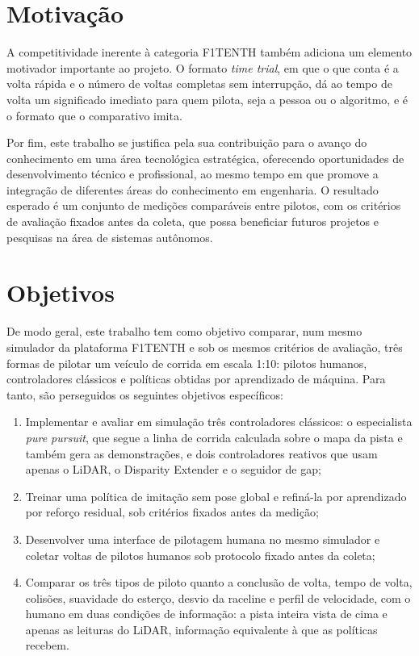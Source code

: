 \section*{Motivação}\label{sec:motivacao}

A competitividade inerente à categoria F1TENTH também adiciona um elemento
motivador importante ao projeto. O formato \textit{time trial}, em que o que
conta é a volta rápida e o número de voltas completas sem interrupção, dá ao
tempo de volta um significado imediato para quem pilota, seja a pessoa ou o
algoritmo, e é o formato que o comparativo imita.

Por fim, este trabalho se justifica pela sua contribuição para o avanço do
conhecimento em uma área tecnológica estratégica, oferecendo oportunidades de
desenvolvimento técnico e profissional, ao mesmo tempo em que promove a
integração de diferentes áreas do conhecimento em engenharia. O resultado
esperado é um conjunto de medições comparáveis entre pilotos, com os critérios de
avaliação fixados antes da coleta, que possa beneficiar futuros projetos e
pesquisas na área de sistemas autônomos.

\section*{Objetivos}\label{sec:objetivos}

De modo geral, este trabalho tem como objetivo comparar, num mesmo simulador da
plataforma F1TENTH e sob os mesmos critérios de avaliação, três formas de
pilotar um veículo de corrida em escala 1:10: pilotos humanos, controladores
clássicos e políticas obtidas por aprendizado de máquina. Para tanto, são
perseguidos os seguintes objetivos específicos:
\begin{enumerate}
    \item Implementar e avaliar em simulação três controladores clássicos: o
          especialista \textit{pure pursuit}, que segue a linha de corrida
          calculada sobre o mapa da pista e também gera as demonstrações, e dois
          controladores reativos que usam apenas o LiDAR, o Disparity Extender e
          o seguidor de gap;
    \item Treinar uma política de imitação sem pose global e refiná-la por
          aprendizado por reforço residual, sob critérios fixados antes da
          medição;
    \item Desenvolver uma interface de pilotagem humana no mesmo simulador e
          coletar voltas de pilotos humanos sob protocolo fixado antes da
          coleta;
    \item Comparar os três tipos de piloto quanto a conclusão de volta, tempo de
          volta, colisões, suavidade do esterço, desvio da raceline e perfil de
          velocidade, com o humano em duas condições de informação: a pista
          inteira vista de cima e apenas as leituras do LiDAR, informação
          equivalente à que as políticas recebem.
\end{enumerate}

